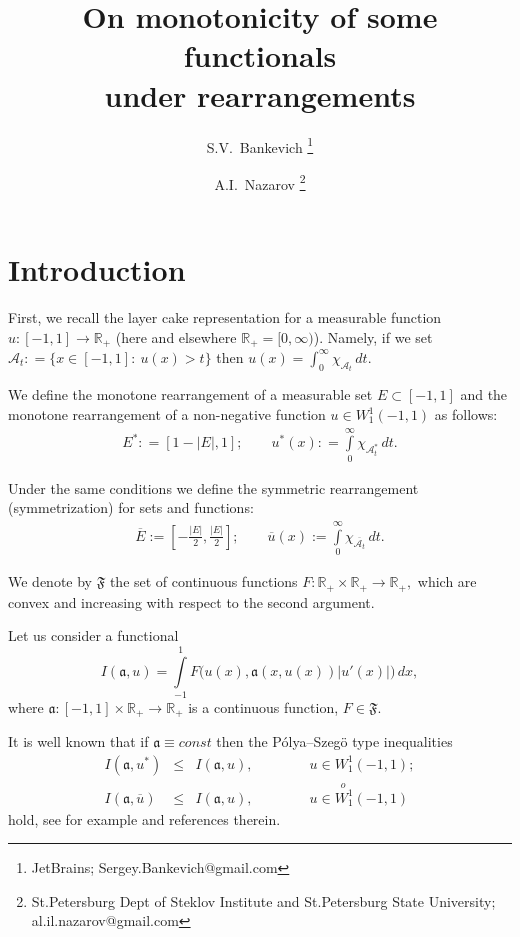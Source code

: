 \documentclass[12pt]{article}
\newcommand{\Real}{\mathbb R}
\newcommand{\abs}[1]{\left\vert#1\right\vert}
\renewcommand{\le}{\leqslant}
\newcommand{\Wf}{\stackrel{o\ }{W_1^1}}
\newcommand{\W}{W_1^1}
\begin{document}
\title{On monotonicity of some functionals \\ under rearrangements}
\author{
S.V.~Bankevich
\footnote{JetBrains; Sergey.Bankevich@gmail.com}
\and
A.I.~Nazarov
\footnote{St.Petersburg Dept of Steklov Institute and St.Petersburg State University; al.il.nazarov@gmail.com}
}

\maketitle

\section{Introduction}

First, we recall the layer cake representation for a measurable function $u: [-1, 1] \to \Real_+$
(here and elsewhere $\Real_+ = [0,\infty)$).
Namely, if we set $\mathcal{A}_t: = \{x \in [-1,1]:\ u(x)> t \}$
then $u(x) = \int_0^\infty \chi_{\mathcal{A}_t} \, dt$.

We define the monotone rearrangement of a measurable set $E \subset [-1, 1]$ and the
monotone rearrangement of a non-negative function $u \in \W (-1, 1)$ as follows:
\begin{eqnarray*}
E^*: = [1 - \abs{E}, 1]; \qquad
u^*(x): = \int\limits_0^\infty \chi_{\mathcal{A}_t^*} \, dt.
\end{eqnarray*}

Under the same conditions we define the symmetric rearrangement 
(symmetrization) for sets and functions:
\begin{eqnarray*}
\overline{E} := [-\frac{\abs{E}}{2}, \frac{\abs{E}}{2}]; \qquad
\overline{u}(x) := \int\limits_0^\infty \chi_{\overline{\mathcal{A}_t}} \, dt.
\end{eqnarray*}

We denote by $\mathfrak{F}$ the set of continuous functions 
$F: \Real_+ \times \Real_+ \to \Real_+,$
which are convex and increasing with respect to the second argument.

Let us consider a functional
\begin{equation}
\label{functional}
I(\mathfrak a, u) = \int\limits_{-1}^1 F\big(u(x), \mathfrak a(x, u(x)) \abs{u'(x)}\big) \, dx,
\end{equation}
where $\mathfrak a: [-1, 1] \times \Real_+ \to \Real_+$ is a continuous function, $F \in \mathfrak{F}$.

It is well known that if $\mathfrak a \equiv const$ then the P\'olya--Szeg\"o type inequalities
\begin{eqnarray}
\label{toprove}
I(\mathfrak a, u^*) & \le & I(\mathfrak a, u), \qquad \qquad u \in \W(-1, 1);\\
\label{toproveSymm}
I(\mathfrak a, \overline{u}) & \le & I(\mathfrak a, u), \qquad \qquad u \in \Wf(-1, 1)
\end{eqnarray}
hold, see for example \cite{Kawohl} and references therein.
\end{document}
